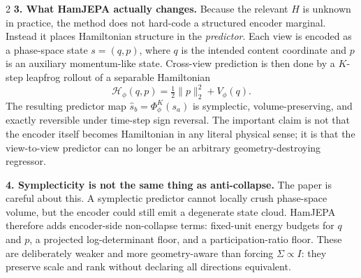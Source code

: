 \documentclass[10pt]{article}
\begin{document}
\begin{multicols}{2}
\textbf{\color{ink}3. What HamJEPA actually changes.} Because the relevant \(H\) is unknown in practice, the method does not hard-code a structured encoder marginal. Instead it places Hamiltonian structure in the \emph{predictor}. Each view is encoded as a phase-space state \(s=(q,p)\), where \(q\) is the intended content coordinate and \(p\) is an auxiliary momentum-like state. Cross-view prediction is then done by a \(K\)-step leapfrog rollout of a separable Hamiltonian
\[
\mathcal H_\phi(q,p)=\tfrac12\|p\|_2^2+V_\phi(q).
\]
The resulting predictor map \(\hat s_b=\Phi_\phi^K(s_a)\) is symplectic, volume-preserving, and exactly reversible under time-step sign reversal. The important claim is not that the encoder itself becomes Hamiltonian in any literal physical sense; it is that the view-to-view predictor can no longer be an arbitrary geometry-destroying regressor.

\textbf{\color{ink}4. Symplecticity is not the same thing as anti-collapse.} The paper is careful about this. A symplectic predictor cannot locally crush phase-space volume, but the encoder could still emit a degenerate state cloud. HamJEPA therefore adds encoder-side non-collapse terms: fixed-unit energy budgets for \(q\) and \(p\), a projected log-determinant floor, and a participation-ratio floor. These are deliberately weaker and more geometry-aware than forcing \(\Sigma\propto I\): they preserve scale and rank without declaring all directions equivalent.

\end{multicols}
\end{document}
